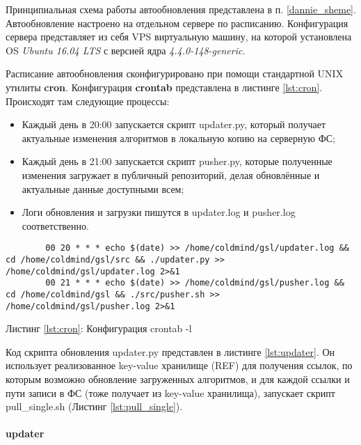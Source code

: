 Принципиальная схема работы автообновления представлена в п. \ref{dannie_sheme}.\\
Автообновление настроено на отдельном сервере по расписанию. Конфигурация
сервера представляет из себя VPS виртуальную машину, на которой установлена OS
\emph{Ubuntu 16.04 LTS} с версией ядра \emph{4.4.0-148-generic}.

Расписание автообновления сконфигурировано при помощи стандартной UNIX утилиты
\textbf{cron}.  Конфигурация \textbf{crontab} представлена в листинге
\ref{lst:cron}. Происходят там следующие процессы:

\begin{itemize}
    \item Каждый день в 20:00 запускается скрипт {\small updater.py}, который получает актуальные изменения алгоритмов в локальную копию на серверную ФС;
    \item Каждый день в 21:00 запускается скрипт {\small pusher.py}, которые полученные изменения загружает в публичный репозиторий, делая обновлённые и актуальные данные доступными всем;
    \item Логи обновления и загрузки пишутся в {\small updater.log} и {\small pusher.log} соответственно.
\end{itemize}

\begin{center}
\begin{lstlisting}
        00 20 * * * echo $(date) >> /home/coldmind/gsl/updater.log && cd /home/coldmind/gsl/src && ./updater.py >> /home/coldmind/gsl/updater.log 2>&1
        00 21 * * * echo $(date) >> /home/coldmind/gsl/pusher.log && cd /home/coldmind/gsl && ./src/pusher.sh >> /home/coldmind/gsl/pusher.log 2>&1
\end{lstlisting}\label{lst:cron}
    Листинг \ref{lst:cron}: Конфигурация {\small crontab -l}
\end{center}

Код скрипта обновления {\small updater.py} представлен в листинге
\ref{lst:updater}. Он использует реализованное key-value хранилище (REF) для
получения ссылок, по которым возможно обновление загруженных алгоритмов, и для
каждой ссылки и пути записи в ФС (тоже получает из key-value хранилища),
запускает скрипт {\small pull\_single.sh} (Листинг \ref{lst:pull_single}).

\paragraph{updater}

